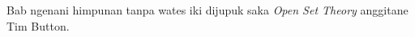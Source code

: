 \documentclass[../../../include/open-logic-chapter]{subfiles}
\begin{document}

\begin{editorial}
Bab ngenani himpunan tanpa wates iki dijupuk saka \emph{Open Set
Theory} anggitane Tim Button.
\end{editorial}

\end{document}
